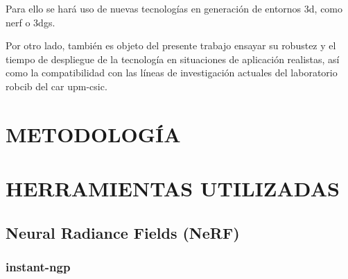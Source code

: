 \documentclass[a4paper, 12pt, spanish, twoside]{article}
\begin{document}
Para ello se hará uso de nuevas tecnologías en generación de entornos \acrshort{3d}, como \acrfull{nerf} o \acrfull{3dgs}.

Por otro lado, también es objeto del presente trabajo ensayar su robustez y el tiempo de despliegue de la tecnología en situaciones de aplicación realistas, así como la compatibilidad con las líneas de investigación actuales del laboratorio \acrshort{robcib} del \acrshort{car} \acrshort{upm}-\acrshort{csic}.

\clearpage





\newpage
\section{METODOLOGÍA} \label{sec:metodologia}


\clearpage





\newpage
\section{HERRAMIENTAS UTILIZADAS} \label{sec:herramientas}


\subsection{Neural Radiance Fields (NeRF)} \label{sec:herramientas:nerf}

\subsubsection{instant-ngp} \label{sec:herramientas:nerf:instant-ngp}
\end{document}
